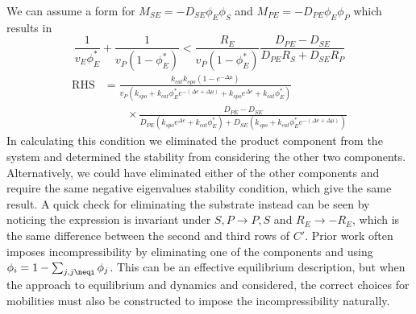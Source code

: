 We can assume a form for $M_{SE} = -D_{SE}\phi_E\phi_S$ and $M_{PE} = -D_{PE}\phi_E\phi_P$ which results in
\begin{equation}
    \frac{1}{v_E\phi_E^*}+\frac{1}{v_P(1-\phi_E^*)} < \frac{R_E}{v_P(1-\phi_E^*)}\frac{D_{PE}-D_{SE}}{D_{PE}R_S+D_{SE}R_P}
\end{equation}
\begin{equation}
\begin{split}
\text{RHS} &= \frac{k_{cat}k_{spo}(1-e^{-\Delta\mu})}{v_P(k_{spo}+k_{cat}\phi_E^*e^{-(\Delta e+\Delta\mu)}+k_{spo}e^{\Delta e}+k_{cat}\phi_E^*)} \\ 
& \quad \quad \times \frac{D_{PE}-D_{SE}}{D_{PE}(k_{spo}e^{\Delta e}+k_{cat}\phi_E^*)+D_{SE}(k_{spo}+k_{cat}\phi_E^*e^{-(\Delta e+\Delta\mu)})}
\end{split}
\end{equation}
In calculating this condition we eliminated the product component from the system and determined the stability from considering the other two components. Alternatively, we could have eliminated either of the other components and require the same negative eigenvalues stability condition, which give the same result. A quick check for eliminating the substrate instead can be seen by noticing the expression is invariant under $S, P \rightarrow P, S$ and $R_E \rightarrow -R_E$, which is the same difference between the second and third rows of $C'$. Prior work often imposes incompressibility by eliminating one of the components and using $\phi_i = 1-\sum_{j,j\neqi}\phi_j$. This can be an effective equilibrium description, but when the approach to equilibrium and dynamics and considered, the correct choices for mobilities must also be constructed to impose the incompressibility naturally.

